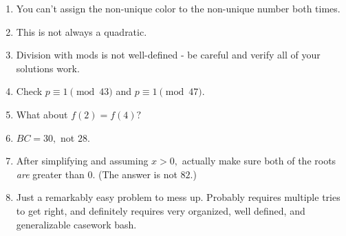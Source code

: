 \documentclass[mast]{lucky}
\begin{document}
\begin{enumerate}
    \item You can't assign the non-unique color to the non-unique number both times.
    
    \item This is not always a quadratic.
    
    \item Division with mods is not well-defined - be careful and verify all of your solutions work.
    
    \item Check $p\equiv 1\pmod{43}$ and $p\equiv 1\pmod{47}.$
    
    \item What about $f(2)=f(4)?$
    
    \item $BC=30,$ not $28.$
    
    \item After simplifying and assuming $x>0,$ actually make sure both of the roots \textit{are} greater than $0.$ (The answer is not $82.$)
    
    \item Just a remarkably easy problem to mess up. Probably requires multiple tries to get right, and definitely requires very organized, well defined, and generalizable casework bash.
    
\end{enumerate}
\end{document}
